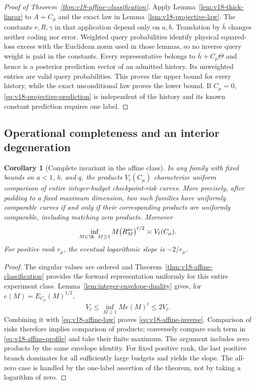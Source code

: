 \documentclass[11pt]{amsart}
\newtheorem{corollary}[theorem]{Corollary}
\theoremstyle{definition}\newtheorem{definition}[theorem]{Definition}
\theoremstyle{remark}\newtheorem{remark}[theorem]{Remark}
\begin{document}
\begin{proof}[Proof of Theorem~\ref{thm:v18-affine-classification}]
Apply Lemma~\ref{lem:v18-thick-linear} to $A=C_\mu$ and the exact law
in Lemma~\ref{lem:v18-projective-law}. The constants $r,R,\gamma$ in
that application depend only on $a,b$. Translation by $\bar h$ changes
neither coding nor error. Weighted query probabilities identify physical
squared-loss excess with the Euclidean norm used in those lemmas, so no
inverse query weight is paid in the constants. Every representative
belongs to $\bar h+C_\mu\Theta$ and hence is a posterior prediction
vector of an admitted history. Its unweighted entries are valid query
probabilities. This proves the upper bound for every history, while
the exact unconditional law proves the lower bound. If $C_\mu=0$,
\eqref{eq:v18-projective-prediction} is independent of the history and
its known constant prediction requires one label.
\end{proof}

\subsection{Operational completeness and an interior degeneration}
\begin{corollary}[Complete invariant in the affine class]
\label{cor:v18-affine-invariant}
In any family with fixed bounds on $a<1$, $b$, and $q$, the products
$V_\ell(C_\mu)$ characterize uniform comparison of entire integer-budget
checkpoint-risk curves. More precisely, after padding to a fixed maximum
dimension, two such families have uniformly comparable curves if and
only if their corresponding products are uniformly comparable,
including matching zero products. Moreover
\begin{equation}\label{eq:v18-affine-inverse}
 \inf_{M\in\N,\ M\ge1}M\bigl(R^{\mathrm{av}}_M\bigr)^{\ell/2}
 \asymp V_\ell(C_\mu).
\end{equation}
For positive rank $r_\mu$, the eventual logarithmic slope is $-2/r_\mu$.
\end{corollary}
\begin{proof}
The singular values are ordered and Theorem~\ref{thm:v18-affine-classification}
provides the forward representation uniformly for this entire experiment
class. Lemma~\ref{lem:integer-envelope-duality} gives, for
$e(M)=E_{C_\mu}(M)^{1/2}$,
\[
 V_\ell\le\inf_{M\ge1}Me(M)^\ell\le2V_\ell.
\]
Combining it with \eqref{eq:v18-affine-law} proves
\eqref{eq:v18-affine-inverse}. Comparison of risks therefore implies
comparison of products; conversely compare each term in
\eqref{eq:v18-affine-profile} and take their finite maximum.
The argument includes zero products by the same envelope identity.
For fixed positive rank, the last positive branch dominates for all
sufficiently large budgets and yields the slope. The all-zero case is
handled by the one-label assertion of the theorem, not by taking a
logarithm of zero.
\end{proof}
\end{document}
